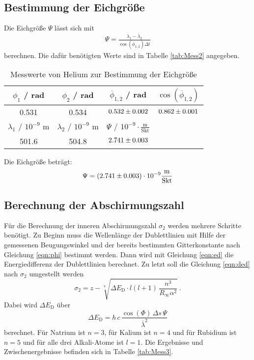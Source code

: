 \subsection{Bestimmung der Eichgröße}
Die Eichgröße $\Psi$ lässt sich mit
\begin{align}
  \Psi = \frac{\lambda_1 - \lambda_2}{\cos(\overline{\phi}_{1, 2}) \Delta t}
\end{align}
berechnen. Die dafür benötigten Werte sind in Tabelle \eqref{tab:Mess2} angegeben.

\begin{table}[H]
  \centering
  \begin{tabular}{c|c|c|c}
    \hline
    $\phi_1$ / rad & $\phi_2$ / rad & $\overline{\phi}_{1,2}$ / rad & $\cos(\overline{\phi}_{1,2})$ \\
    \hline
    0.531 & 0.534 & $\num{0.532 +- 0.002}$ & $\num{0.862 +- 0.001}$ \\
    \hline
    \hline
    $\lambda_1$ / $10^{-9}$ m & $\lambda_2$ / $10^{-9}$ m & $\Psi$ / $10^{-9} \cdot \frac{\text{m}}{\text{Skt}}$ \\
    \hline
    501.6 & 504.8 & $\num{2.741 +- 0.003}$ \\
    \hline
  \end{tabular}
  \caption{Messwerte von Helium zur Bestimmung der Eichgröße}
  \label{tab:Mess2}
\end{table}

Die Eichgröße beträgt:
\begin{equation*}
  \Psi = (\num{2.741 +- 0.003}) \cdot 10^{-9} \frac{\text{m}}{\text{Skt}}
\end{equation*}

\subsection{Berechnung der Abschirmungszahl}
Für die Berechnung der inneren Abschirmungszahl $\sigma_2$ werden mehrere Schritte benötigt. Zu Beginn muss die Wellenlänge der Dublettlinien mit Hilfe der gemessenen Beugungswinkel und der bereits bestimmten Gitterkonstante nach Gleichung \eqref{eqn:phi} bestimmt werden. Dann wird mit Gleichung \eqref{eqn:ed} die Energiedifferenz der Dublettlinien berechnet. Zu letzt soll die Gleichung \eqref{eqn:ded} nach $\sigma_2$ umgestellt werden
\begin{equation*}
  \sigma_2 = z - \sqrt[4]{\Delta E_\text{D} \cdot l(l + 1)\, \frac{n^3}{R_\infty \alpha^2}} \ .
\end{equation*}
Dabei wird $\Delta E_\text{D}$ über
\begin{equation*}
  \Delta E_\text{D} = h\,c\, \frac{\cos(\Phi)\,\Delta s\,\Psi}{\overline{\lambda}^2}
\end{equation*}
berechnet.
Für Natrium ist $n = 3$, für Kalium ist $n = 4$ und für Rubidium ist $n = 5$ und für alle drei Alkali-Atome ist $l = 1$. Die Ergebnisse und Zwischenergebnisse befinden sich in Tabelle \eqref{tab:Mess3}.

